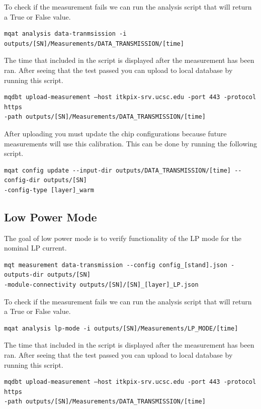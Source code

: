 \documentclass[12pt]{article}
\begin{document}
To check if the measurement fails we can run the analysis script that will return a True or False value. 
\begin{verbatim}
mqat analysis data-tranmsission -i outputs/[SN]/Measurements/DATA_TRANSMISSION/[time]
\end{verbatim}

The time that included in the script is displayed after the measurement has been ran. After seeing that the test passed you can upload to local database by running this script. 

\begin{verbatim}
mqdbt upload-measurement –host itkpix-srv.ucsc.edu -port 443 -protocol https
-path outputs/[SN]/Measurements/DATA_TRANSMISSION/[time]
\end{verbatim}
After uploading you must update the chip configurations because future measurements will use this calibration. This can be done by running the following script. 
\begin{verbatim}
mqat config update --input-dir outputs/DATA_TRANSMISSION/[time] --config-dir outputs/[SN] 
-config-type [layer]_warm
\end{verbatim}

\subsection{Low Power Mode}

The goal of low power mode is to verify functionality of the LP mode for the nominal LP current.

\begin{verbatim}
mqt measurement data-transmission --config config_[stand].json -outputs-dir outputs/[SN]
-module-connectivity outputs/[SN]/[SN]_[layer]_LP.json
\end{verbatim}

To check if the measurement fails we can run the analysis script that will return a True or False value. 
\begin{verbatim}
mqat analysis lp-mode -i outputs/[SN]/Measurements/LP_MODE/[time]
\end{verbatim}

The time that included in the script is displayed after the measurement has been ran. After seeing that the test passed you can upload to local database by running this script. 

\begin{verbatim}
mqdbt upload-measurement –host itkpix-srv.ucsc.edu -port 443 -protocol https
-path outputs/[SN]/Measurements/DATA_TRANSMISSION/[time]
\end{verbatim}
\end{document}
